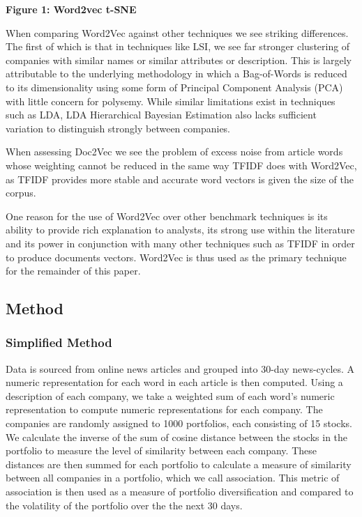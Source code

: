 \documentclass[11pt]{article}
\begin{document}
\textbf{Figure 1: Word2vec t-SNE}

When comparing Word2Vec against other techniques we see striking
differences. The first of which is that in techniques like LSI, we see
far stronger clustering of companies with similar names or similar
attributes or description. This is largely attributable to the
underlying methodology in which a Bag-of-Words is reduced to its
dimensionality using some form of Principal Component Analysis (PCA)
with little concern for polysemy. While similar limitations exist in
techniques such as LDA, LDA Hierarchical Bayesian Estimation also lacks
sufficient variation to distinguish strongly between companies.

When assessing Doc2Vec we see the problem of excess noise from article
words whose weighting cannot be reduced in the same way TFIDF does with
Word2Vec, as TFIDF provides more stable and accurate word vectors is
given the size of the corpus.

One reason for the use of Word2Vec over other benchmark techniques is
its ability to provide rich explanation to analysts, its strong use
within the literature and its power in conjunction with many other
techniques such as TFIDF in order to produce documents vectors. Word2Vec
is thus used as the primary technique for the remainder of this paper.

\hypertarget{method}{%
\subsection{Method}\label{method}}

\hypertarget{simplified-method}{%
\subsubsection{Simplified Method}\label{simplified-method}}

Data is sourced from online news articles and grouped into 30-day
news-cycles. A numeric representation for each word in each article is
then computed. Using a description of each company, we take a weighted
sum of each word's numeric representation to compute numeric
representations for each company. The companies are randomly assigned to
1000 portfolios, each consisting of 15 stocks. We calculate the inverse
of the sum of cosine distance between the stocks in the portfolio to
measure the level of similarity between each company. These distances
are then summed for each portfolio to calculate a measure of similarity
between all companies in a portfolio, which we call association. This
metric of association is then used as a measure of portfolio
diversification and compared to the volatility of the portfolio over the
the next 30 days.
\end{document}
